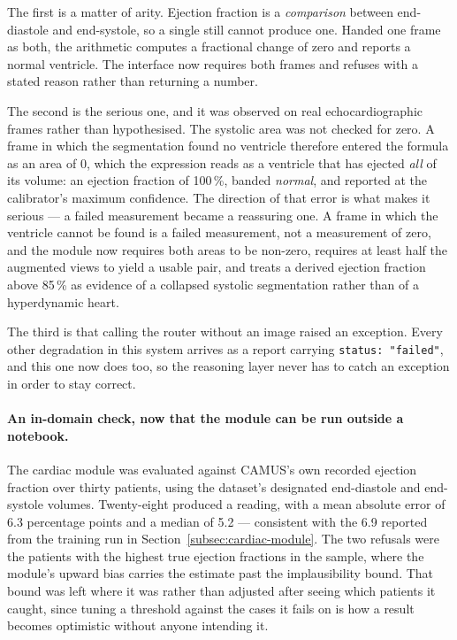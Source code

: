 The first is a matter of arity. Ejection fraction is a \emph{comparison} between end-diastole
and end-systole, so a single still cannot produce one. Handed one frame as both, the arithmetic
computes a fractional change of zero and reports a normal ventricle. The interface now requires
both frames and refuses with a stated reason rather than returning a number.

The second is the serious one, and it was observed on real echocardiographic frames rather than
hypothesised. The systolic area was not checked for zero. A frame in which the segmentation
found no ventricle therefore entered the formula as an area of $0$, which the expression reads
as a ventricle that has ejected \emph{all} of its volume: an ejection fraction of 100\,\%,
banded \emph{normal}, and reported at the calibrator's maximum confidence. The direction of that
error is what makes it serious --- a failed measurement became a reassuring one. A frame in
which the ventricle cannot be found is a failed measurement, not a measurement of zero, and the
module now requires both areas to be non-zero, requires at least half the augmented views to
yield a usable pair, and treats a derived ejection fraction above 85\,\% as evidence of a
collapsed systolic segmentation rather than of a hyperdynamic heart.

The third is that calling the router without an image raised an exception. Every other
degradation in this system arrives as a report carrying \texttt{status: "failed"}, and this one
now does too, so the reasoning layer never has to catch an exception in order to stay correct.

\paragraph{An in-domain check, now that the module can be run outside a notebook.} The cardiac
module was evaluated against CAMUS's own recorded ejection fraction over thirty patients, using
the dataset's designated end-diastole and end-systole volumes. Twenty-eight produced a reading,
with a mean absolute error of 6.3 percentage points and a median of 5.2 --- consistent with the
6.9 reported from the training run in Section~\ref{subsec:cardiac-module}. The two refusals were
the patients with the highest true ejection fractions in the sample, where the module's upward
bias carries the estimate past the implausibility bound. That bound was left where it was rather
than adjusted after seeing which patients it caught, since tuning a threshold against the cases
it fails on is how a result becomes optimistic without anyone intending it.

